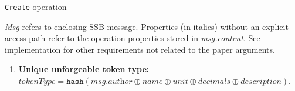 \documentclass[sigplan,screen,10pt]{acmart}
\newcommand\invpathcomment[0]{
\begin{flushleft}
{\color{commentgray}\textit{Msg} refers to enclosing SSB message. Properties (in italics) without an explicit access path refer to the operation properties stored in \textit{msg.content}. See implementation for other requirements not related to the paper arguments.} 
\label{req:comment}
\end{flushleft}}
\begin{document}
\begin{invariants}[hb]
\caption{\texttt{Create} operation}
\label{alg:create}
\invpathcomment
\begin{enumerate}[label={C\arabic*},leftmargin=*]
  \item \textbf{Unique unforgeable token type:} \newline $\textit{tokenType} = \texttt{hash}(\textit{msg.author} \oplus \textit{name} \oplus \textit{unit} \oplus  \textit{decimals}  \oplus   \textit{description})$. \label{alg:create:unique-hash}
\end{enumerate}
\end{invariants}
\end{document}
